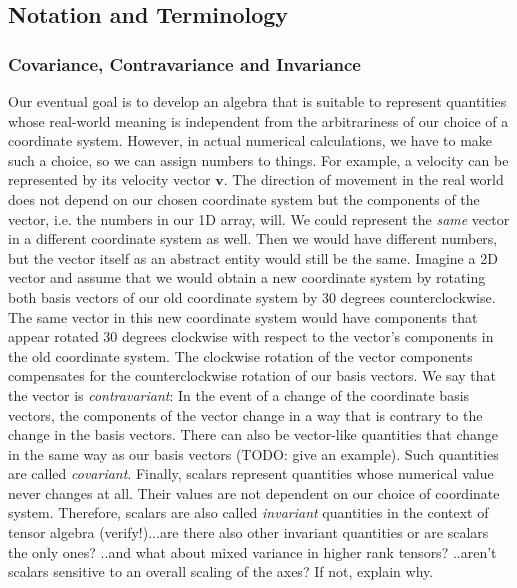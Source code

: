 \subsection{Notation and Terminology}

\subsubsection{Covariance, Contravariance and Invariance}
Our eventual goal is to develop an algebra that is suitable to represent quantities whose real-world meaning is independent from the arbitrariness of our choice of a coordinate system. However, in actual numerical calculations, we have to make such a choice, so we can assign numbers to things. For example, a velocity can be represented by its velocity vector $\mathbf{v}$. The direction of movement in the real world does not depend on our chosen coordinate system but the components of the vector, i.e. the numbers in our 1D array, will. We could represent the \emph{same} vector in a different coordinate system as well. Then we would have different numbers, but the vector itself as an abstract entity would still be the same. Imagine a 2D vector and assume that we would obtain a new coordinate system by rotating both basis vectors of our old coordinate system by 30 degrees counterclockwise. The same vector in this new coordinate system would have components that appear rotated 30 degrees clockwise with respect to the vector's components in the old coordinate system. The clockwise rotation of the vector components compensates for the counterclockwise rotation of our basis vectors. We say that the vector is \emph{contravariant}: In the event of a change of the coordinate basis vectors, the components of the vector change in a way that is contrary to the change in the basis vectors. There can also be vector-like quantities that change in the same way as our basis vectors (TODO: give an example). Such quantities are called \emph{covariant}. Finally, scalars represent quantities whose numerical value never changes at all. Their values are not dependent on our choice of coordinate system. Therefore, scalars are also called \emph{invariant} quantities in the context of tensor algebra (verify!)...are there also other invariant quantities or are scalars the only ones? ..and what about mixed variance in higher rank tensors? ..aren't scalars sensitive to an overall scaling of the axes? If not, explain why. %



